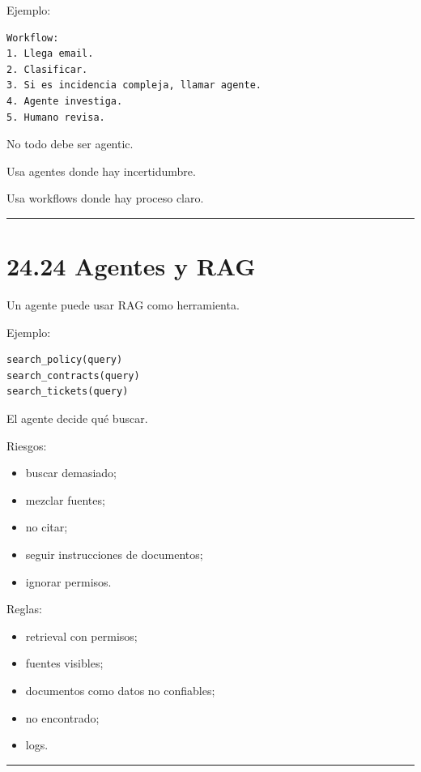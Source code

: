 Ejemplo:

\begin{lstlisting}
Workflow:
1. Llega email.
2. Clasificar.
3. Si es incidencia compleja, llamar agente.
4. Agente investiga.
5. Humano revisa.
\end{lstlisting}

No todo debe ser agentic.

Usa agentes donde hay incertidumbre.

Usa workflows donde hay proceso claro.

\begin{center}\rule{0.5\linewidth}{0.5pt}\end{center}

\section{24.24 Agentes y RAG}\label{agentes-y-rag}

Un agente puede usar RAG como herramienta.

Ejemplo:

\begin{lstlisting}
search_policy(query)
search_contracts(query)
search_tickets(query)
\end{lstlisting}

El agente decide qué buscar.

Riesgos:

\begin{itemize}
\tightlist
\item
  buscar demasiado;
\item
  mezclar fuentes;
\item
  no citar;
\item
  seguir instrucciones de documentos;
\item
  ignorar permisos.
\end{itemize}

Reglas:

\begin{itemize}
\tightlist
\item
  retrieval con permisos;
\item
  fuentes visibles;
\item
  documentos como datos no confiables;
\item
  no encontrado;
\item
  logs.
\end{itemize}

\begin{center}\rule{0.5\linewidth}{0.5pt}\end{center}

